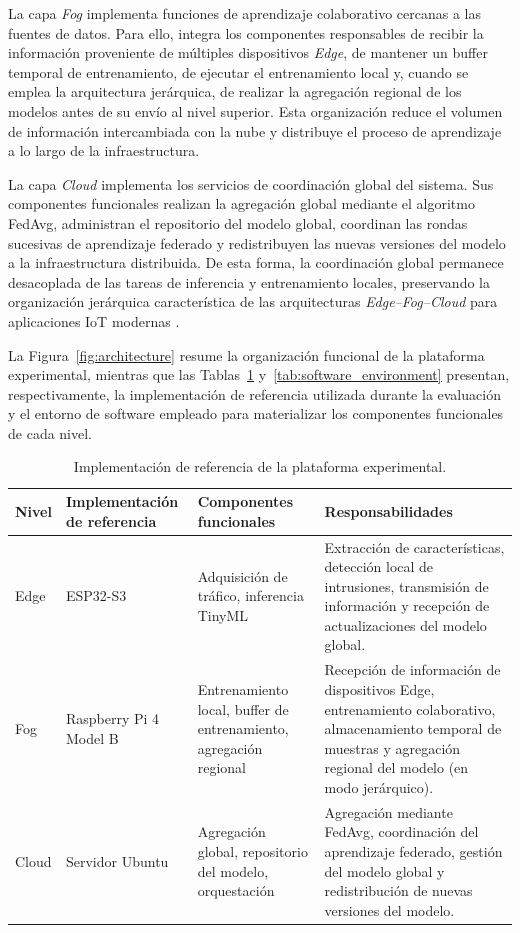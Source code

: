 \documentclass[journal,article,submit,moreauthors]{Definitions/mdpi}
\begin{document}
La capa \textit{Fog} implementa funciones de aprendizaje colaborativo cercanas a las fuentes de datos. Para ello, integra los componentes responsables de recibir la información proveniente de múltiples dispositivos \textit{Edge}, de mantener un buffer temporal de entrenamiento, de ejecutar el entrenamiento local y, cuando se emplea la arquitectura jerárquica, de realizar la agregación regional de los modelos antes de su envío al nivel superior. Esta organización reduce el volumen de información intercambiada con la nube y distribuye el proceso de aprendizaje a lo largo de la infraestructura.

La capa \textit{Cloud} implementa los servicios de coordinación global del sistema. Sus componentes funcionales realizan la agregación global mediante el algoritmo FedAvg, administran el repositorio del modelo global, coordinan las rondas sucesivas de aprendizaje federado y redistribuyen las nuevas versiones del modelo a la infraestructura distribuida. De esta forma, la coordinación global permanece desacoplada de las tareas de inferencia y entrenamiento locales, preservando la organización jerárquica característica de las arquitecturas \textit{Edge--Fog--Cloud} para aplicaciones IoT modernas \cite{Hajj2023,Ficco2024}.

La Figura~\ref{fig:architecture} resume la organización funcional de la plataforma experimental, mientras que las Tablas~\ref{tab:experimental_platform} y~\ref{tab:software_environment} presentan, respectivamente, la implementación de referencia utilizada durante la evaluación y el entorno de software empleado para materializar los componentes funcionales de cada nivel.

\begin{table}[ht]
\centering
\caption{Implementación de referencia de la plataforma experimental.}
\label{tab:experimental_platform}
\footnotesize
\begin{tabular}{l p{2.5cm}p{4cm}p{5cm}}
\toprule
\textbf{Nivel} &
\textbf{Implementación de referencia} &
\textbf{Componentes funcionales} &
\textbf{Responsabilidades} \\
\midrule

Edge & ESP32-S3 & Adquisición de tráfico, inferencia TinyML & Extracción de características, detección local de intrusiones, transmisión de información y recepción de actualizaciones del modelo global. \\

Fog & Raspberry Pi 4 Model B & Entrenamiento local, buffer de entrenamiento, agregación regional &
Recepción de información de dispositivos Edge, entrenamiento colaborativo, almacenamiento temporal de muestras y agregación regional del modelo (en modo jerárquico). \\

Cloud & Servidor Ubuntu & Agregación global, repositorio del modelo, orquestación &
Agregación mediante FedAvg, coordinación del aprendizaje federado, gestión del modelo global y redistribución de nuevas versiones del modelo. \\
\bottomrule
\end{tabular}
\end{table}
\end{document}
